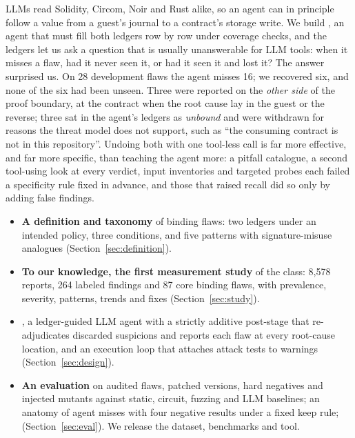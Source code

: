 LLMs read Solidity, Circom, Noir and Rust alike, so an agent can in
principle follow a value from a guest's journal to a contract's storage
write. We build \tool{}, an agent that must fill both ledgers row by row
under coverage checks, and the ledgers let us ask a question that is usually
unanswerable for LLM tools: when it misses a flaw, had it never seen it, or
had it seen it and lost it? The answer surprised us. On 28 development flaws the agent
misses 16; we recovered six, and none of the six had been unseen. Three were reported on the \emph{other side} of the
proof boundary, at the contract when the root cause lay in the guest or the
reverse; three sat in the agent's ledgers as \emph{unbound} and were
withdrawn for reasons the threat model does not support, such as ``the
consuming contract is not in this repository''. Undoing both with one
tool-less call is far more effective, and far more specific, than teaching
the agent more: a pitfall catalogue, a second tool-using look at every
verdict, input inventories and targeted probes each failed a specificity
rule fixed in advance, and those that raised recall did so only by adding
false findings.

\begin{itemize}
\item \textbf{A definition and taxonomy} of binding flaws: two ledgers under
an intended policy, three conditions, and five patterns with
signature-misuse analogues (Section~\ref{sec:definition}).
\item \textbf{To our knowledge, the first measurement study} of the class:
8,578 reports, 264 labeled findings and 87 core binding flaws, with
prevalence, severity, patterns, trends and fixes (Section~\ref{sec:study}).
\item \textbf{\tool{}}, a ledger-guided LLM agent with a strictly additive
post-stage that re-adjudicates discarded suspicions and reports each flaw at
every root-cause location, and an execution loop that attaches attack tests
to warnings (Section~\ref{sec:design}).
\item \textbf{An evaluation} on audited flaws, patched versions, hard
negatives and injected mutants against static, circuit, fuzzing and LLM
baselines; an anatomy of agent misses with four negative results under a
fixed keep rule;  (Section~\ref{sec:eval}). We release the
dataset, benchmarks and tool.
\end{itemize}

